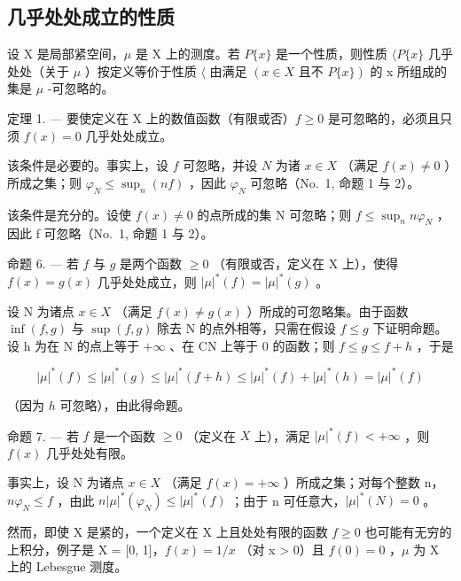\subsection{几乎处处成立的性质}

设 X 是局部紧空间，\(\mu\) 是 X 上的测度。若 \(P\{x\}\) 是一个性质，则性质 \(\langle P\{x\}\) 几乎处处（关于 \(\mu\) ）按定义等价于性质 \(\langle\) 由满足 \((x \in X \text{ 且不 } P\{x\})\) 的 x 所组成的集是 \(\mu\) -可忽略的。

定理 1. --- 要使定义在 X 上的数值函数（有限或否）\(f \geqslant 0\) 是可忽略的，必须且只须 \(f(x) = 0\) 几乎处处成立。

该条件是必要的。事实上，设 \(f\) 可忽略，并设 \(N\) 为诸 \(x \in X\) （满足 \(f(x) \neq 0\) ）所成之集；则 \(\varphi_N \leqslant \sup_n (nf)\) ，因此 \(\varphi_N\) 可忽略（No.~1, 命题 1 与 2）。

该条件是充分的。设使 \(f(x) \neq 0\) 的点所成的集 N 可忽略；则 \(f \leqslant \sup_{n} n\varphi_{N}\) ，因此 f 可忽略（No.~1, 命题 1 与 2）。

命题 6. --- 若 \(f\) 与 \(g\) 是两个函数 \(\geqslant 0\) （有限或否，定义在 X 上），使得 \(f(x) = g(x)\) 几乎处处成立，则 \(|\mu|^*(f) = |\mu|^*(g)\) 。

设 N 为诸点 \(x \in X\) （满足 \(f(x) \neq g(x)\) ）所成的可忽略集。由于函数 \(\inf(f, g)\) 与 \(\sup(f, g)\) 除去 N 的点外相等，只需在假设 \(f \leqslant g\) 下证明命题。设 h 为在 N 的点上等于 \(+\infty\) 、在 CN 上等于 0 的函数；则 \(f \leqslant g \leqslant f + h\) ，于是

\[
| \mu | ^ {*} (f) \leqslant | \mu | ^ {*} (g) \leqslant | \mu | ^ {*} (f + h) \leqslant | \mu | ^ {*} (f) + | \mu | ^ {*} (h) = | \mu | ^ {*} (f)
\]

（因为 \(h\) 可忽略），由此得命题。

命题 7. --- 若 \(f\) 是一个函数 \(\geqslant 0\) （定义在 \(X\) 上），满足 \(|\mu|^*(f) < +\infty\) ，则 \(f(x)\) 几乎处处有限。

事实上，设 N 为诸点 \(x \in X\) （满足 \(f(x) = +\infty\) ）所成之集；对每个整数 n，\(n\varphi_{N} \leqslant f\) ，由此 \(n|\mu|^{*}(\varphi_{N}) \leqslant |\mu|^{*}(f)\) ；由于 n 可任意大，\(|\mu|^{*}(N) = 0\) 。

然而，即使 X 是紧的，一个定义在 X 上且处处有限的函数 \(f \geqslant 0\) 也可能有无穷的上积分，例子是 X = {[}0, 1{]}，\(f(x) = 1/x\) （对 x \textgreater{} 0）且 \(f(0) = 0\) ，\(\mu\) 为 X 上的 Lebesgue 测度。

